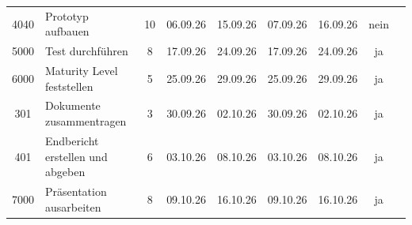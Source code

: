 \documentclass[
  a4paper,
  12pt,
  DIV=12,        %
  parskip=half,  %
  headings=small %
]{scrartcl}
\theoremstyle{definition}
\theoremstyle{definition}
\begin{document}
\begin{tabularx}{\textwidth}{cX@{}ccccccc}
\footnotesize 4040 & \footnotesize Prototyp aufbauen & \footnotesize 10 & \footnotesize 06.09.26 & \footnotesize 15.09.26 & \footnotesize 07.09.26 & \footnotesize 16.09.26 & \footnotesize nein \\
\footnotesize 5000 & \footnotesize Test durchführen & \footnotesize 8 & \footnotesize 17.09.26 & \footnotesize 24.09.26 & \footnotesize 17.09.26 & \footnotesize 24.09.26 & \footnotesize ja \\
\footnotesize 6000 & \footnotesize Maturity Level feststellen & \footnotesize 5 & \footnotesize 25.09.26 & \footnotesize 29.09.26 & \footnotesize 25.09.26 & \footnotesize 29.09.26 & \footnotesize ja \\
\footnotesize 301 & \footnotesize Dokumente zusammentragen & \footnotesize 3 & \footnotesize 30.09.26 & \footnotesize 02.10.26 & \footnotesize 30.09.26 & \footnotesize 02.10.26 & \footnotesize ja \\
\footnotesize 401 & \footnotesize Endbericht erstellen und abgeben & \footnotesize 6 & \footnotesize 03.10.26 & \footnotesize 08.10.26 & \footnotesize 03.10.26 & \footnotesize 08.10.26 & \footnotesize ja \\
\footnotesize 7000 & \footnotesize Präsentation ausarbeiten & \footnotesize 8 & \footnotesize 09.10.26 & \footnotesize 16.10.26 & \footnotesize 09.10.26 & \footnotesize 16.10.26 & \footnotesize ja \\

\bottomrule
\end{tabularx}















\begin{landscape}
\thispagestyle{empty}   %
\null\vfill
\noindent\hspace*{\dimexpr1in + \topmargin + \headheight + \headsep
                  - (\paperheight-\linewidth)/2 - 3.8pt\relax}%
\vfill
\end{landscape}
\end{document}
